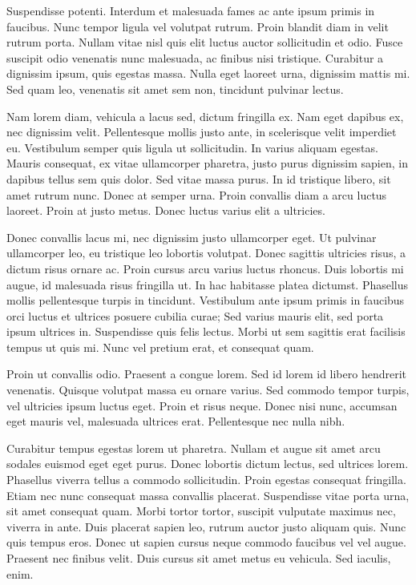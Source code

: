 \documentclass{article}
\begin{document}
Suspendisse potenti. Interdum et malesuada fames ac ante ipsum primis in
faucibus. Nunc tempor ligula vel volutpat rutrum. Proin blandit diam in
velit rutrum porta. Nullam vitae nisl quis elit luctus auctor
sollicitudin et odio. Fusce suscipit odio venenatis nunc malesuada, ac
finibus nisi tristique. Curabitur a dignissim ipsum, quis egestas massa.
Nulla eget laoreet urna, dignissim mattis mi. Sed quam leo, venenatis
sit amet sem non, tincidunt pulvinar lectus.

Nam lorem diam, vehicula a lacus sed, dictum fringilla ex. Nam eget
dapibus ex, nec dignissim velit. Pellentesque mollis justo ante, in
scelerisque velit imperdiet eu. Vestibulum semper quis ligula ut
sollicitudin. In varius aliquam egestas. Mauris consequat, ex vitae
ullamcorper pharetra, justo purus dignissim sapien, in dapibus tellus
sem quis dolor. Sed vitae massa purus. In id tristique libero, sit amet
rutrum nunc. Donec at semper urna. Proin convallis diam a arcu luctus
laoreet. Proin at justo metus. Donec luctus varius elit a ultricies.

Donec convallis lacus mi, nec dignissim justo ullamcorper eget. Ut
pulvinar ullamcorper leo, eu tristique leo lobortis volutpat. Donec
sagittis ultricies risus, a dictum risus ornare ac. Proin cursus arcu
varius luctus rhoncus. Duis lobortis mi augue, id malesuada risus
fringilla ut. In hac habitasse platea dictumst. Phasellus mollis
pellentesque turpis in tincidunt. Vestibulum ante ipsum primis in
faucibus orci luctus et ultrices posuere cubilia curae; Sed varius
mauris elit, sed porta ipsum ultrices in. Suspendisse quis felis lectus.
Morbi ut sem sagittis erat facilisis tempus ut quis mi. Nunc vel pretium
erat, et consequat quam.

Proin ut convallis odio. Praesent a congue lorem. Sed id lorem id libero
hendrerit venenatis. Quisque volutpat massa eu ornare varius. Sed
commodo tempor turpis, vel ultricies ipsum luctus eget. Proin et risus
neque. Donec nisi nunc, accumsan eget mauris vel, malesuada ultrices
erat. Pellentesque nec nulla nibh.

Curabitur tempus egestas lorem ut pharetra. Nullam et augue sit amet
arcu sodales euismod eget eget purus. Donec lobortis dictum lectus, sed
ultrices lorem. Phasellus viverra tellus a commodo sollicitudin. Proin
egestas consequat fringilla. Etiam nec nunc consequat massa convallis
placerat. Suspendisse vitae porta urna, sit amet consequat quam. Morbi
tortor tortor, suscipit vulputate maximus nec, viverra in ante. Duis
placerat sapien leo, rutrum auctor justo aliquam quis. Nunc quis tempus
eros. Donec ut sapien cursus neque commodo faucibus vel vel augue.
Praesent nec finibus velit. Duis cursus sit amet metus eu vehicula. Sed
iaculis, enim.


\end{document}
